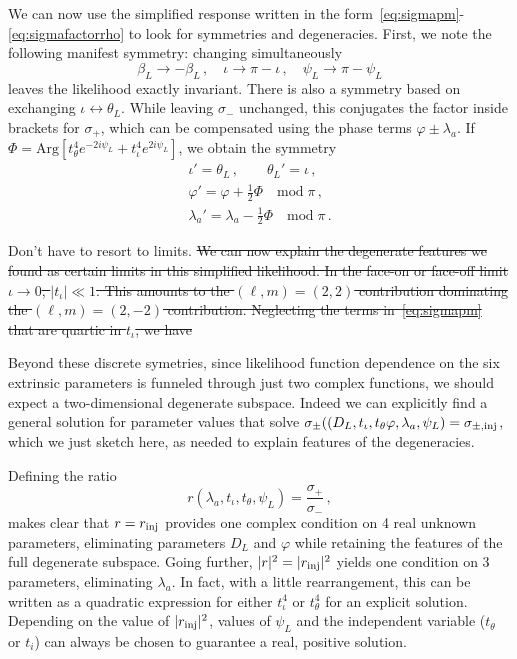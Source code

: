 \documentclass[aps,showpacs,twocolumn,prd,superscriptaddress,nofootinbib]{revtex4-1}
\newcommand{\be}{\begin{equation}}
\newcommand{\ee}{\end{equation}}
\newcommand{\bsub}{\begin{subequations}}
\newcommand{\esub}{\end{subequations}}
\newcommand{\nn}{\nonumber}
\newcommand\betaL{{\beta_{L}}}
\newcommand\psiL{{\psi_{L}}}
\newcommand{\jgb}[1]{{\color{DarkGreen} #1}}
\begin{document}
We can now use the simplified response written in the form~\eqref{eq:sigmapm}-\eqref{eq:sigmafactorrho} to look for symmetries and degeneracies. First, we note the following manifest symmetry: changing simultaneously
\be\label{eq:symmetryresponse}
	\betaL \rightarrow -\betaL\,, \quad \iota \rightarrow \pi - \iota \,, \quad \psiL \rightarrow \pi - \psiL
\ee
leaves the likelihood exactly invariant. There is also a symmetry based on exchanging $\iota \leftrightarrow \theta_{L}$. While leaving $\sigma_-$ unchanged, this conjugates the factor inside brackets for $\sigma_{+}$, which can be compensated using the phase terms $\varphi \pm \lambda_{a}$. If $\Phi = \mathrm{Arg} \left[ t_{\theta}^{4} e^{-2 i \psiL} + t_{\iota}^{4} e^{2 i \psiL} \right]$, we obtain the symmetry
\begin{align}
	\iota' = \theta_{L} \,, \qquad \theta_{L}' = \iota \,, \nn\\
	\varphi' = \varphi + \frac{1}{2} \Phi \quad \mathrm{mod} \; \pi\,, \nn\\
	\lambda_{a}' = \lambda_{a} - \frac{1}{2} \Phi \quad \mathrm{mod} \; \pi\,.
\end{align}

\jgb{Don't have to resort to limits.}
\sout{We can now explain the degenerate features we found as certain limits in this simplified likelihood. In the face-on or face-off limit $\iota \rightarrow 0$, $|t_{\iota}| \ll 1$. This amounts to the $(\ell,m)=(2,2)$ contribution dominating the $(\ell, m)=(2,-2)$ contribution. Neglecting the terms in~\eqref{eq:sigmapm} that are quartic in $t_{\iota}$, we have}

Beyond these discrete symetries, since likelihood function dependence on the six extrinsic parameters is funneled through just two complex functions, we should expect a two-dimensional degenerate subspace.  Indeed we can explicitly find a general solution for parameter values that solve $\sigma_{\pm}((D_{L}, t_\iota, t_\theta \varphi, \lambda_a, \psiL)=\sigma_{\pm,{\rm inj}}$, which we just sketch here, as needed to explain features of the degeneracies.

Defining the ratio
\be
	r(\lambda_a, t_\iota, t_\theta, \psiL) = \frac{\sigma_{+}}{\sigma_{-}} \,,
\ee
makes clear that $r=r_{\rm inj}$ provides one complex condition on 4 real unknown parameters, eliminating parameters $D_{L}$ and $\varphi$ while retaining the features of the full degenerate subspace.  Going further, $|r|^2=|r_{\rm inj}|^2$ yields one condition on 3 parameters, eliminating $\lambda_a$.  In fact, with a little rearrangement, this can be written as a quadratic expression for either $t_\iota^4$ or $t_\theta^4$ for an explicit solution.  Depending on the value of $|r_{\rm inj}|^2$, values of $\psiL$ and the independent variable ($t_\theta$ or $t_i$) can always be chosen to guarantee a real, positive solution.
\end{document}
